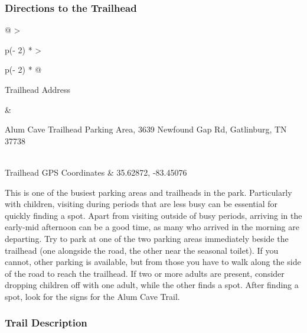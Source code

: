 \documentclass[
  letterpaper,
  DIV=11,
  numbers=noendperiod]{scrartcl}
\begin{document}
\hypertarget{directions-to-the-trailhead-29}{%
\subsubsection{Directions to the
Trailhead}\label{directions-to-the-trailhead-29}}

\begin{longtable}[]{@{}
  >{\raggedright\arraybackslash}p{(\columnwidth - 2\tabcolsep) * }
  >{\raggedright\arraybackslash}p{(\columnwidth - 2\tabcolsep) * }@{}}
\toprule\noalign{}
\begin{minipage}[b]{\linewidth}\raggedright
Trailhead Address
\end{minipage} & \begin{minipage}[b]{\linewidth}\raggedright
Alum Cave Trailhead Parking Area, 3639 Newfound Gap Rd, Gatlinburg, TN
37738
\end{minipage} \\
\midrule\noalign{}
\endhead
\bottomrule\noalign{}
\endlastfoot
Trailhead GPS Coordinates & 35.62872, -83.45076 \\
\end{longtable}

This is one of the busiest parking areas and trailheads in the park.
Particularly with children, visiting during periods that are less busy
can be essential for quickly finding a spot. Apart from visiting outside
of busy periods, arriving in the early-mid afternoon can be a good time,
as many who arrived in the morning are departing. Try to park at one of
the two parking areas immediately beside the trailhead (one alongside
the road, the other near the seasonal toilet). If you cannot, other
parking is available, but from those you have to walk along the side of
the road to reach the trailhead. If two or more adults are present,
consider dropping children off with one adult, while the other finds a
spot. After finding a spot, look for the signs for the Alum Cave Trail.

\hypertarget{trail-description-29}{%
\subsubsection{Trail Description}\label{trail-description-29}}
\end{document}

